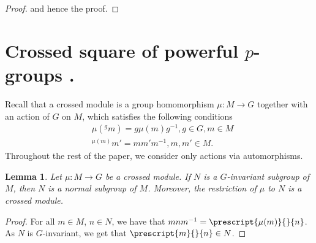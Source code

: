 \documentclass[12pt]{elsarticle}
\newtheorem{lemma}[theorem]{Lemma}
\newtheorem*{main corollary*}{Main Corollary}
\theoremstyle{definition}
\begin{document}
\begin{proof}
and hence the proof.
\end{proof}





\section{Crossed square of powerful $p$-groups .} \label{section: crossed square I}
Recall that a crossed module is a group homomorphism $\mu: M \to G$ together with an action of $G$ on $M$, which satisfies the following conditions
\begin{align}
    &\mu(^g m)=g\mu(m)g^{-1} , g\in G, m\in M\label{E:Crossed module 1}\\
        &^{\mu(m)}m'=mm'm^{-1}, m,m'\in M\label{E:Crossed module 2}.
\end{align}
Throughout the rest of the paper, we consider only actions via automorphisms.
\begin{lemma} \label{Ginvariant is normal}
    Let $\mu: M \to G$ be a crossed module. If $N$ is a $G$-invariant subgroup of $M$, then $N$ is a normal subgroup of $M$. Moreover, the restriction of $\mu$ to $N$ is a crossed module.
\end{lemma}
\begin{proof}
    For all $m \in M$, $n \in N$, we have that $mnm^{-1}=\prescript{\mu(m)}{}{n}$. As $N$ is $G$-invariant, we get that $\prescript{m}{}{n} \in N$.
\end{proof}
	
\end{document}
